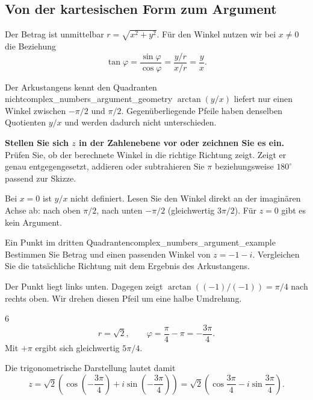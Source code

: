 \clearpage
\subsection{Von der kartesischen Form zum Argument}
Der Betrag ist unmittelbar $r=\sqrt{x^2+y^2}$. Für den Winkel nutzen wir
bei $x\ne0$ die Beziehung
\[
  \tan\varphi=\frac{\sin\varphi}{\cos\varphi}
    =\frac{y/r}{x/r}=\frac{y}{x}.
\]
\begin{KeyPointBox}{Der Arkustangens kennt den Quadranten nicht}{complex_numbers_argument_geometry}
  $\arctan(y/x)$ liefert nur einen Winkel zwischen $-\pi/2$ und $\pi/2$.
  Gegenüberliegende Pfeile haben denselben Quotienten $y/x$ und werden
  dadurch nicht unterschieden.

  \textbf{Stellen Sie sich $z$ in der Zahlenebene vor oder zeichnen Sie es ein.}
  Prüfen Sie, ob der berechnete Winkel in die richtige Richtung zeigt.
  Zeigt er genau entgegengesetzt, addieren oder subtrahieren Sie
  $\pi$ beziehungsweise $180^\circ$ passend zur Skizze.

  Bei $x=0$ ist $y/x$ nicht definiert. Lesen Sie den Winkel direkt an der
  imaginären Achse ab: nach oben $\pi/2$, nach unten $-\pi/2$
  (gleichwertig $3\pi/2$). Für $z=0$ gibt es kein Argument.
\end{KeyPointBox}
\begin{ExampleBox}{Ein Punkt im dritten Quadranten}{complex_numbers_argument_example}
  Bestimmen Sie Betrag und einen passenden Winkel von $z=-1-i$.
  Vergleichen Sie die tatsächliche Richtung mit dem Ergebnis des Arkustangens.
  \par\smallskip
  \begin{minipage}[c]{0.47\linewidth}
  \end{minipage}\hfill
  \begin{minipage}[c]{0.48\linewidth}
    Der Punkt liegt links unten. Dagegen zeigt
    $\arctan((-1)/(-1))=\pi/4$ nach rechts oben.
    Wir drehen diesen Pfeil um eine halbe Umdrehung.
    \begin{ClozeArea}[15]{6}
      \[
        r=\sqrt2,\qquad
        \varphi=\frac\pi4-\pi=-\frac{3\pi}{4}.
      \]
      Mit $+\pi$ ergibt sich gleichwertig $5\pi/4$.
    \end{ClozeArea}
  \end{minipage}
  \par\medskip
  Die trigonometrische Darstellung lautet damit
  \[
    z=\sqrt2\left(\cos\left(-\frac{3\pi}{4}\right)
                +i\sin\left(-\frac{3\pi}{4}\right)\right)
     =\sqrt2\left(\cos\frac{3\pi}{4}-i\sin\frac{3\pi}{4}\right).
  \]
\end{ExampleBox}
